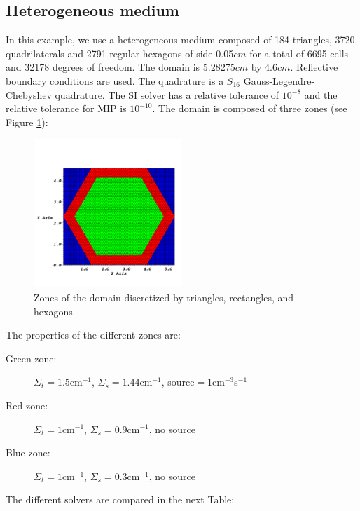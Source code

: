 \subsection{Heterogeneous medium}
In this example, we use a heterogeneous medium composed of 184 triangles, 3720
quadrilaterals and 2791 regular hexagons of side 0.05$cm$ for a total of 6695 
cells and 32178 degrees of freedom. The domain is 5.28275$cm$ by 4.6$cm$. 
Reflective boundary conditions are used. The quadrature is a $S_{16}$ 
Gauss-Legendre-Chebyshev quadrature. The SI solver has a relative tolerance of 
$10^{-8}$ and the relative tolerance for MIP is $10^{-10}$. The domain is 
composed of three zones (see Figure \ref{fig_zone_hex}):
\begin{figure}[H]
  \centering
  \includegraphics[width=0.5\textwidth]{./Dsa/source_crop}
  \caption{Zones of the domain discretized by triangles, rectangles, and
  hexagons}
  \label{fig_zone_hex}
\end{figure}
The properties of the different zones are:
\begin{description}
  \item[Green zone:] $\Sigma_t =1.5$cm$^{-1}$, $\Sigma_s = 1.44$cm$^{-1}$, source$ =
    1$cm$^{-3}$s$^{-1}$
  \item[Red zone:] $\Sigma_t = 1$cm$^{-1}$, $\Sigma_s = 0.9$cm$^{-1}$, no source
  \item[Blue zone:] $\Sigma_t = 1$cm$^{-1}$, $\Sigma_s = 0.3$cm$^{-1}$, no source
\end{description}
The different solvers are compared in the next Table:

